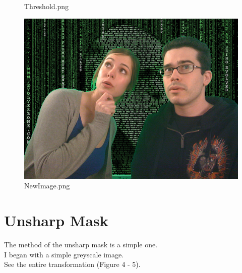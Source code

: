 \documentclass{article}
\begin{document}
\begin{figure}[h!]
\begin{minipage}[b]{0.3\textwidth}
    \caption{Threshold.png}
  \end{minipage}
  \hfill
  \begin{minipage}[b]{0.3\textwidth}
    \includegraphics[width=\textwidth]{Q1_2.png}
    \caption{NewImage.png}
  \end{minipage}
\end{figure}


\section{Unsharp Mask}

The method of the unsharp mask is a simple one.\\
I began with a simple greyscale image.\\
See the entire transformation (Figure 4 - 5).
\end{document}
